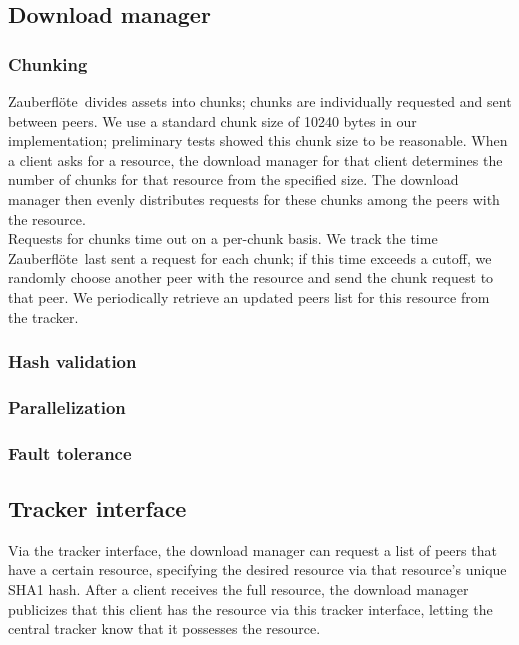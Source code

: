 \documentclass[letterpaper,twocolumn,10pt]{article}
\newcommand{\zbf}{Zauberfl\"{o}te}
\begin{document}

\subsection{Download manager}


\subsubsection{Chunking}

\zbf\ divides assets into chunks; chunks are individually requested and sent between peers. We use a standard chunk size of 10240 bytes in our implementation; preliminary tests showed this chunk size to be reasonable. When a client asks for a resource, the download manager for that client determines the number of chunks for that resource from the specified size. The download manager then evenly distributes requests for these chunks among the peers with the resource. \\
Requests for chunks time out on a per-chunk basis. We track the time \zbf\ last sent a request for each chunk; if this time exceeds a cutoff, we randomly choose another peer with the resource and send the chunk request to that peer. We periodically retrieve an updated peers list for this resource from the tracker. 

\subsubsection{Hash validation}


\subsubsection{Parallelization}


\subsubsection{Fault tolerance}


\subsection{Tracker interface}

Via the tracker interface, the download manager can request a list of peers that 
have a certain resource, specifying the desired resource via that resource's 
unique SHA1 hash. After a client receives the full resource, the download 
manager publicizes that this client has the resource via this tracker interface,
letting the central tracker know that it possesses the resource.
\end{document}

